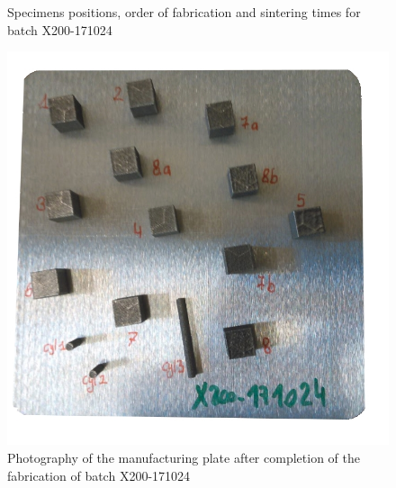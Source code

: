 \begin{figure}[ht]
\centering
\noindent{}
\decoRule
\caption[Specimens positions, order of fabrication and sintering times for batch X200-171024]{Specimens positions, order of fabrication and sintering times for batch X200-171024}
\label{fig:171024-cad}
\end{figure}

\begin{figure}[ht]
\centering
\includegraphics[scale=0.45]{Images/171024-real}
\decoRule
\caption[Photography of the manufacturing plate after completion of the fabrication of batch X200-171024]{Photography of the manufacturing plate after completion of the fabrication of batch X200-171024}
\label{fig:171024-real}
\end{figure}


